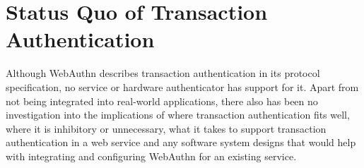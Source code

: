 



\section{Status Quo of Transaction Authentication}\label{Sec:StatusQuo}

Although WebAuthn describes transaction authentication in its protocol specification, no service or hardware authenticator has support for it. Apart from not being integrated into real-world applications, there also has been no investigation into the implications of where transaction authentication fits well, where it is inhibitory or unnecessary, what it takes to support transaction authentication in a web service and any software system designs that would help with integrating and configuring WebAuthn for an existing service.

